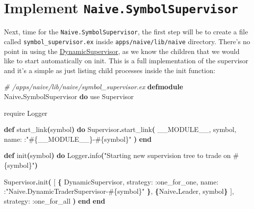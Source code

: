 \documentclass[
  oneside]{book}
\newenvironment{Shaded}{\begin{snugshade}}{\end{snugshade}}
\newcommand{\CommentTok}[1]{\textcolor[rgb]{0.56,0.35,0.01}{\textit{#1}}}
\newcommand{\ConstantTok}[1]{\textcolor[rgb]{0.56,0.35,0.01}{#1}}
\newcommand{\FunctionTok}[1]{\textcolor[rgb]{0.13,0.29,0.53}{\textbf{#1}}}
\newcommand{\ImportTok}[1]{#1}
\newcommand{\KeywordTok}[1]{\textcolor[rgb]{0.13,0.29,0.53}{\textbf{#1}}}
\newcommand{\NormalTok}[1]{#1}
\newcommand{\OperatorTok}[1]{\textcolor[rgb]{0.81,0.36,0.00}{\textbf{#1}}}
\newcommand{\OtherTok}[1]{\textcolor[rgb]{0.56,0.35,0.01}{#1}}
\newcommand{\StringTok}[1]{\textcolor[rgb]{0.31,0.60,0.02}{#1}}
\newcommand{\VariableTok}[1]{\textcolor[rgb]{0.00,0.00,0.00}{#1}}
\begin{document}
\section{\texorpdfstring{Implement \texttt{Naive.SymbolSupervisor}}{Implement Naive.SymbolSupervisor}}\label{implement-naive.symbolsupervisor}

Next, time for the \texttt{Naive.SymbolSupervisor}, the first step will be to create a file called \texttt{symbol\_supervisor.ex} inside \texttt{apps/naive/lib/naive} directory. There's no point in using the \href{https://hexdocs.pm/elixir/master/DynamicSupervisor.html}{DynamicSupervisor}, as we know the children that we would like to start automatically on init. This is a full implementation of the supervisor and it's a simple as just listing child processes inside the init function:

\begin{Shaded}
\begin{Highlighting}[]
\CommentTok{\# /apps/naive/lib/naive/symbol\_supervisor.ex}
\KeywordTok{defmodule} \ConstantTok{Naive}\OperatorTok{.}\ConstantTok{SymbolSupervisor} \KeywordTok{do}
  \ImportTok{use} \ConstantTok{Supervisor}

  \ImportTok{require} \ConstantTok{Logger}

  \KeywordTok{def}\NormalTok{ start\_link}\FunctionTok{(}\NormalTok{symbol}\FunctionTok{)} \KeywordTok{do}
    \ConstantTok{Supervisor}\OperatorTok{.}\NormalTok{start\_link}\FunctionTok{(}
      \ConstantTok{\_\_MODULE\_\_}\NormalTok{,}
\NormalTok{      symbol,}
      \VariableTok{name:}\NormalTok{ :}\StringTok{"}\OtherTok{\#\{}\ConstantTok{\_\_MODULE\_\_}\OtherTok{\}}\StringTok{{-}}\OtherTok{\#\{}\NormalTok{symbol}\OtherTok{\}}\StringTok{"}
    \FunctionTok{)}
  \KeywordTok{end}

  \KeywordTok{def}\NormalTok{ init}\FunctionTok{(}\NormalTok{symbol}\FunctionTok{)} \KeywordTok{do}
    \ConstantTok{Logger}\OperatorTok{.}\NormalTok{info}\FunctionTok{(}\StringTok{"Starting new supervision tree to trade on }\OtherTok{\#\{}\NormalTok{symbol}\OtherTok{\}}\StringTok{"}\FunctionTok{)}

    \ConstantTok{Supervisor}\OperatorTok{.}\NormalTok{init}\FunctionTok{(}
      \OtherTok{[}
        \FunctionTok{\{}
          \ConstantTok{DynamicSupervisor}\NormalTok{,}
          \VariableTok{strategy:} \VariableTok{:one\_for\_one}\NormalTok{,}
          \VariableTok{name:}\NormalTok{ :}\StringTok{"Naive.DynamicTraderSupervisor{-}}\OtherTok{\#\{}\NormalTok{symbol}\OtherTok{\}}\StringTok{"}
        \FunctionTok{\}}\NormalTok{,}
        \FunctionTok{\{}\ConstantTok{Naive}\OperatorTok{.}\ConstantTok{Leader}\NormalTok{, symbol}\FunctionTok{\}}
      \OtherTok{]}\NormalTok{,}
      \VariableTok{strategy:} \VariableTok{:one\_for\_all}
    \FunctionTok{)}
  \KeywordTok{end}
\KeywordTok{end}
\end{Highlighting}
\end{Shaded}
\end{document}
